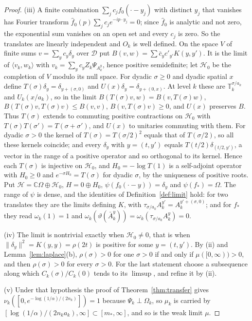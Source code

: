 \documentclass[11pt]{amsart}
\theoremstyle{definition}
\theoremstyle{remark}
\numberwithin{equation}{section}
\newcommand{\C}{\mathbb{C}}
\newcommand{\ip}[2]{\langle #1,#2\rangle}
\begin{document}
\begin{proof}
(iii) A finite combination $\sum_jc_jf_0(\cdot-y_j)$ with distinct $y_j$ that
vanishes has Fourier transform $\hat f_0(p)\sum_jc_je^{-ip\cdot y_j}=0$; since
$\hat f_0$ is analytic and not zero, the exponential sum vanishes on an open
set and every $c_j$ is zero. So the translates are linearly independent and
$O_k$ is well defined. On the space $V$ of finite sums $v=\sum_yc_y\delta_y$
over $\mathcal D$ put $B(v,w)=\sum\bar c_yc'_{y'}K(y,y')$. It is the limit of
$\ip{v_k}{w_k}$ with $v_k=\sum_yc_yZ_k\Psi_{A^y_k}$, hence positive
semidefinite; let $\mathcal H_0$ be the completion of $V$ modulo its null
space. For dyadic $\sigma\ge0$ and dyadic spatial $x$ define
$T(\sigma)\delta_y=\delta_{y+(\sigma,0)}$ and $U(x)\delta_y=\delta_{y+(0,x)}$.
At level $k$ these are $\mathbb T_k^{\sigma/a_k}$ and $U_k(x/a_k)$, so in the
limit $B(T(\sigma)v,w)=B(v,T(\sigma)w)$, $B(T(\sigma)v,T(\sigma)v)\le B(v,v)$,
$B(v,T(\sigma)v)\ge0$, and $U(x)$ preserves $B$. Thus $T(\sigma)$ extends to
commuting positive contractions on $\mathcal H_0$ with
$T(\sigma)T(\sigma')=T(\sigma+\sigma')$, and $U(x)$ to unitaries commuting with
them. For dyadic $\sigma>0$ the kernel of $T(\sigma)=T(\sigma/2)^2$ equals that
of $T(\sigma/2)$, so all these kernels coincide; and every $\delta_y$ with
$y=(t,y')$ equals $T(t/2)\delta_{(t/2,y')}$, a vector in the range of a
positive operator and so orthogonal to its kernel. Hence each $T(\sigma)$ is
injective on $\mathcal H_0$, and $H_0=-\log T(1)$ is a self-adjoint operator
with $H_0\ge0$ and $e^{-\sigma H_0}=T(\sigma)$ for dyadic $\sigma$, by the
uniqueness of positive roots. Put $\mathcal H=\C\Omega\oplus\mathcal H_0$,
$H=0\oplus H_0$, $\psi(f_0(\cdot-y))=\delta_y$ and $\psi(f_*)=\Omega$. The range
of $\psi$ is dense, and the identities of Definition~\ref{def:limit} hold: for
two translates they are the limits defining $K$, with $\tau_{\sigma/a_k}A^{y'}_k=
A^{y'+(\sigma,0)}_k$; and for $f_*$ they read $\omega_k(1)=1$ and
$\omega_k(\vartheta(\bar A^y_k))=\omega_k(\tau_{\sigma/a_k}A^y_k)=0$.

(iv) The limit is nontrivial exactly when $\mathcal H_0\ne0$, that is when
$\|\delta_y\|^2=K(y,y)=\rho(2t)$ is positive for some $y=(t,y')$. By (ii) and Lemma~\ref{lem:laplace}(b),
$\rho(\sigma)>0$ for one $\sigma>0$ if and only if $\mu([0,\infty))>0$, and
then $\rho(\sigma)>0$ for every $\sigma>0$. For the last statement choose a
subsequence along which $C_k(\sigma)/C_k(0)$ tends to its $\limsup$, and refine
it by (ii).

(v) Under that hypothesis the proof of Theorem~\ref{thm:transfer} gives
$\nu_k([0,e^{-\log(1/\alpha)/(2n_k)}])=1$ because $\Psi_k\perp\Omega_k$, so
$\mu_k$ is carried by $[\log(1/\alpha)/(2n_ka_k),\infty]\subset[m_*,\infty]$,
and so is the weak limit $\mu$.
\end{proof}
\end{document}
